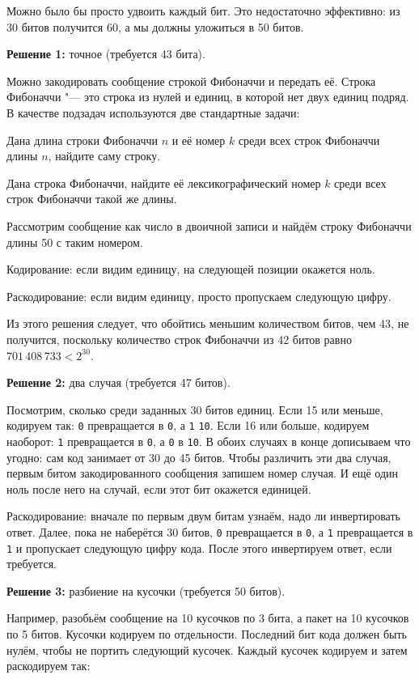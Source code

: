 Можно было бы просто удвоить каждый бит.
Это недостаточно эффективно: из 30 битов получится 60,
а мы должны уложиться в 50 битов.

\medskip
\textbf{Решение 1:} точное (требуется 43 бита).

Можно закодировать сообщение строкой Фибоначчи и передать её.
Строка Фибоначчи "--- это строка из нулей и единиц,
в которой нет двух единиц подряд.
В качестве подзадач используются две стандартные задачи:
\begin{shortnums}
\item Дана длина строки Фибоначчи $n$ и её номер $k$ среди всех строк
Фибоначчи длины $n$, найдите саму строку.
\item Дана строка Фибоначчи, найдите её лексикографический номер $k$
среди всех строк Фибоначчи такой же длины.
\end{shortnums}

Рассмотрим сообщение как число в двоичной записи
и найдём строку Фибоначчи длины 50 с таким номером.

Кодирование: если видим единицу, на следующей позиции окажется ноль.

Раскодирование: если видим единицу, просто пропускаем следующую цифру.

Из этого решения следует, что обойтись меньшим количеством битов,
чем 43, не получится, поскольку количество строк Фибоначчи из 42 битов
равно $701\,408\,733 < 2^{30}$.

\medskip
\textbf{Решение 2:} два случая (требуется 47 битов).

Посмотрим, сколько среди заданных 30 битов единиц.
Если 15 или меньше, кодируем так: \texttt{0} превращается в \texttt{0},
а \texttt{1} \texttt{10}.
Если 16 или больше, кодируем наоборот: \texttt{1} превращается в \texttt{0},
а \texttt{0} в \texttt{10}.
В обоих случаях в конце дописываем что угодно: сам код занимает
от 30 до 45 битов.
Чтобы различить эти два случая, первым битом закодированного сообщения
запишем номер случая.
И ещё один ноль после него на случай, если этот бит окажется единицей.

Раскодирование: вначале по первым двум битам узнаём,
надо ли инвертировать ответ.
Далее, пока не наберётся 30 битов, \texttt{0} превращается в \texttt{0},
а \texttt{1} превращается в \texttt{1} и пропускает следующую цифру кода.
После этого инвертируем ответ, если требуется.

\medskip
\textbf{Решение 3:} разбиение на кусочки (требуется 50 битов).

Например, разобьём сообщение на 10 кусочков по 3 бита,
а пакет на 10 кусочков по 5 битов.
Кусочки кодируем по отдельности.
Последний бит кода должен быть нулём, чтобы не портить следующий кусочек.
Каждый кусочек кодируем и затем раскодируем так:

